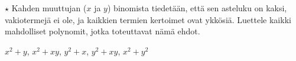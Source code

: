 \begin{tehtavasivu}
\begin{tehtava}
	$\star$ Kahden muuttujan ($x$ ja $y$) binomista tiedetään, että sen asteluku on kaksi, vakiotermejä ei ole, ja kaikkien termien kertoimet ovat ykkösiä. Luettele kaikki mahdolliset polynomit, jotka toteuttavat nämä ehdot.
	
	\begin{vastaus}
		$x^2+y$, $x^2+xy$, $y^2+x$, $y^2+xy$, $x^2+y^2$
	\end{vastaus}
\end{tehtava}

\end{tehtavasivu}